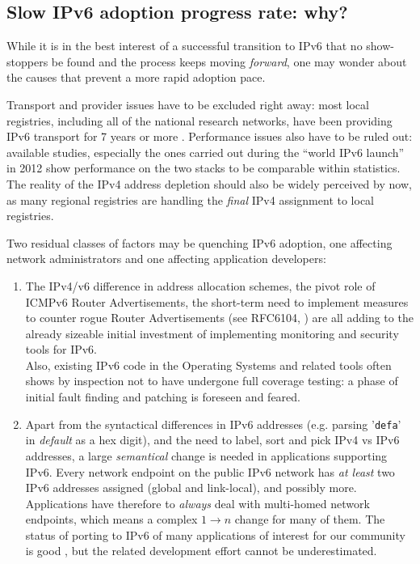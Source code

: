 \subsection{Slow IPv6 adoption progress rate: why?}
While it is in the best interest of a successful transition to IPv6 that
no show-stoppers be found and the process keeps moving {\it forward},
one may wonder about the causes that prevent a more rapid adoption pace.\par
Transport and provider issues have to be excluded right away: most
local registries, including all of the national research networks, have been
providing IPv6 transport for 7 years or more \cite{ripeness}. Performance issues also have to
be ruled out: available studies, especially the ones carried out during the
``world IPv6 launch'' in 2012 \cite{wdayperf} show performance on 
the two stacks to be comparable within statistics. The reality of the IPv4 
address depletion
should also be widely perceived by now, as many regional registries are
handling the {\it final} IPv4 assignment to local registries.\par
Two residual classes of factors may be quenching IPv6 adoption, one
affecting network administrators and one affecting application developers:
\begin{enumerate}
\item {\small
The IPv4/v6 difference in address allocation schemes, the pivot role of
ICMPv6 Router Advertisements, the short-term
need to implement measures to counter rogue Router Advertisements 
(see RFC6104, \cite{rfc}) are all adding to the already sizeable initial 
investment of implementing monitoring and security tools for IPv6.\\
Also, existing IPv6 code in the Operating Systems and related tools often
shows by inspection not to have undergone full coverage testing:
a phase of initial fault finding and patching is foreseen and feared.
}
\item {\small
Apart from the syntactical differences in IPv6 addresses (e.g. parsing
'{\tt defa}' in {\it default} as a hex digit), and the need to label, sort and 
pick IPv4 vs IPv6 addresses, a large {\it semantical} change is
needed in applications supporting IPv6. Every network endpoint on the
public IPv6 network has {\it at least} two IPv6 addresses assigned (global
and link-local), and possibly more. Applications have therefore
to {\it always} deal with multi-homed network endpoints, which means a complex
$1\rightarrow n$ change for many of them. The status of porting to IPv6 of
many applications of interest for our community is good \cite{readiness},
but the related development effort cannot be underestimated.
}
\end{enumerate}
